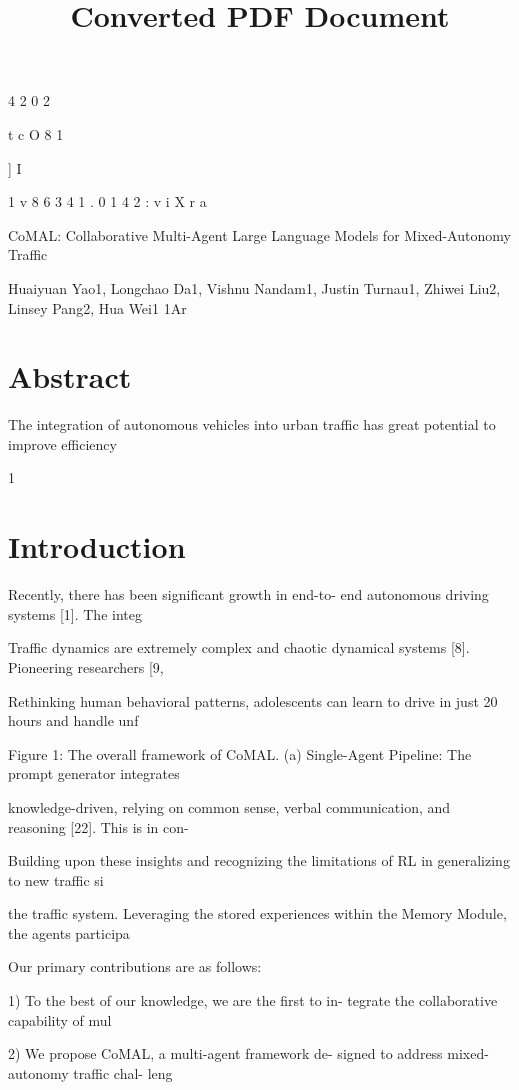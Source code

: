 \documentclass[12pt]{article}
\title{Converted PDF Document}
\author{}
\date{}
\begin{document}
\maketitle

4
2
0
2


t
c
O
8
1


]
I


1
v
8
6
3
4
1
.
0
1
4
2
:
v
i
X
r
a


CoMAL: Collaborative Multi-Agent Large Language Models for
Mixed-Autonomy Traffic


Huaiyuan Yao1, Longchao Da1, Vishnu Nandam1, Justin Turnau1,
Zhiwei Liu2, Linsey Pang2, Hua Wei1
1Ar


\section{Abstract}


The integration of autonomous vehicles into urban traffic has
great potential to improve efficiency 


1


\section{Introduction}


Recently, there has been significant growth in end-to-
end autonomous driving systems [1]. The integ


Traffic dynamics are extremely complex and chaotic
dynamical systems [8]. Pioneering researchers [9,


Rethinking human behavioral patterns, adolescents
can learn to drive in just 20 hours and handle unf


Figure 1: The overall framework of CoMAL. (a) Single-Agent Pipeline: The prompt generator integrates


knowledge-driven, relying on common sense, verbal
communication, and reasoning [22]. This is in con-


Building upon these insights and recognizing the
limitations of RL in generalizing to new traffic si


the traffic system. Leveraging the stored experiences
within the Memory Module, the agents participa


Our primary contributions are as follows:


1) To the best of our knowledge, we are the first to in-
tegrate the collaborative capability of mul


2) We propose CoMAL, a multi-agent framework de-
signed to address mixed-autonomy traffic chal-
leng
\end{document}

